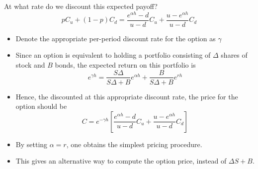 \begin{frame}[fragile,t]
		\begin{center}
	    At what rate do we discount this expected payoff?
			\begin{equation*}
				p C_u + (1-p) C_d = \frac{e^{\alpha h}-d}{u-d} C_u + \frac{u-e^{\alpha h}}{u-d}C_d
			\end{equation*}
			\mySeparateLine
			\bigskip
			\pause


			\begin{itemize}
				\item Denote the appropriate per-period discount rate for the option as $\gamma$
				\item Since an option is equivalent to holding a portfolio consisting of $\Delta$ shares of stock and $B$ bonds, the expected return on this portfolio is
					\begin{equation*}
						e^{\gamma h} = \frac{S \Delta}{S \Delta +B} e^{\alpha h} + \frac{B}{S\Delta +B}e^{r h}
					\end{equation*}
				\item Hence, the discounted at this appropriate discount rate, the price for the option
					should be
					\begin{equation*}
						C = e^{-\gamma h} \left[ \frac{e^{\alpha h}-d}{u-d}C_u+ \frac{u- e^{\alpha h}}{u-d}C_d\right]
					\end{equation*}
				\item By setting $\alpha=r$, one obtains the simplest pricing procedure.
				\item This gives an alternative way to compute the option price, instead of $\Delta S+B$.
			\end{itemize}
		\end{center}
\end{frame}
